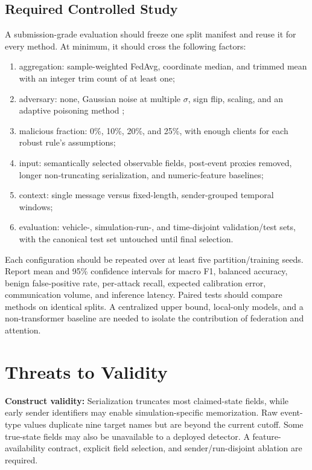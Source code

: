 \documentclass[journal]{IEEEtran}
\begin{document}
\subsection{Required Controlled Study}
A submission-grade evaluation should freeze one split manifest and reuse it for every method. At minimum, it should cross the following factors:
\begin{enumerate}
    \item aggregation: sample-weighted FedAvg, coordinate median, and trimmed mean with an integer trim count of at least one;
    \item adversary: none, Gaussian noise at multiple $\sigma$, sign flip, scaling, and an adaptive poisoning method \cite{fang2020local};
    \item malicious fraction: 0\%, 10\%, 20\%, and 25\%, with enough clients for each robust rule's assumptions;
    \item input: semantically selected observable fields, post-event proxies removed, longer non-truncating serialization, and numeric-feature baselines;
    \item context: single message versus fixed-length, sender-grouped temporal windows;
    \item evaluation: vehicle-, simulation-run-, and time-disjoint validation/test sets, with the canonical test set untouched until final selection.
\end{enumerate}
Each configuration should be repeated over at least five partition/training seeds. Report mean and 95\% confidence intervals for macro F1, balanced accuracy, benign false-positive rate, per-attack recall, expected calibration error, communication volume, and inference latency. Paired tests should compare methods on identical splits. A centralized upper bound, local-only models, and a non-transformer baseline are needed to isolate the contribution of federation and attention.

\section{Threats to Validity}
\textbf{Construct validity:} Serialization truncates most claimed-state fields, while early sender identifiers may enable simulation-specific memorization. Raw event-type values duplicate nine target names but are beyond the current cutoff. Some true-state fields may also be unavailable to a deployed detector. A feature-availability contract, explicit field selection, and sender/run-disjoint ablation are required.
\end{document}
